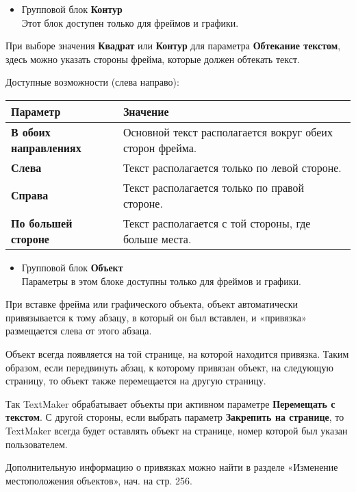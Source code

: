 ﻿\documentclass[a4paper,10pt]{article}
\begin{document}
 \begin{itemize}
  \item Групповой блок \textbf{Контур}\\
  Этот блок доступен только для фреймов и графики.
 \end{itemize}

 При выборе значения \textbf{Квадрат} или \textbf{Контур} для параметра \textbf{Обтекание текстом}, здесь можно указать стороны фрейма, которые должен обтекать текст.
 
 Доступные возможности (слева направо):
 
 \begin{center}
\begin{tabular}{  m{4cm}  m{12cm}  }
 \textbf{Параметр} & \textbf{Значение}\\ 
 \hline
  \textbf{В обоих направлениях} & Основной текст располагается вокруг обеих сторон фрейма.\\
  \textbf{Слева} & Текст располагается только по левой стороне.\\ 
\textbf{Справа} & Текст располагается только по правой стороне.\\
\textbf{По большей стороне} & Текст располагается с той стороны, где больше места.\\
\end{tabular}
\end{center}

\begin{itemize}
 \item Групповой блок \textbf{Объект}\\
 Параметры в этом блоке доступны только для фреймов и графики.
\end{itemize}

При вставке фрейма или графического объекта, объект автоматически привязывается к тому абзацу, в который он был вставлен, и «привязка» размещается слева от этого абзаца.

Объект всегда появляется на той странице, на которой находится привязка. Таким образом, если передвинуть абзац, к которому привязан объект, на следующую страницу, то объект также перемещается на другую страницу.

Так TextMaker обрабатывает объекты при активном параметре \textbf{Перемещать с текстом}.  С другой стороны, если выбрать параметр \textbf{Закрепить на странице}, то TextMaker всегда будет оставлять объект на странице, номер которой был указан пользователем.

Дополнительную информацию о привязках можно найти в разделе «Изменение местоположения объектов», нач. на стр. 256.
\end{document}
